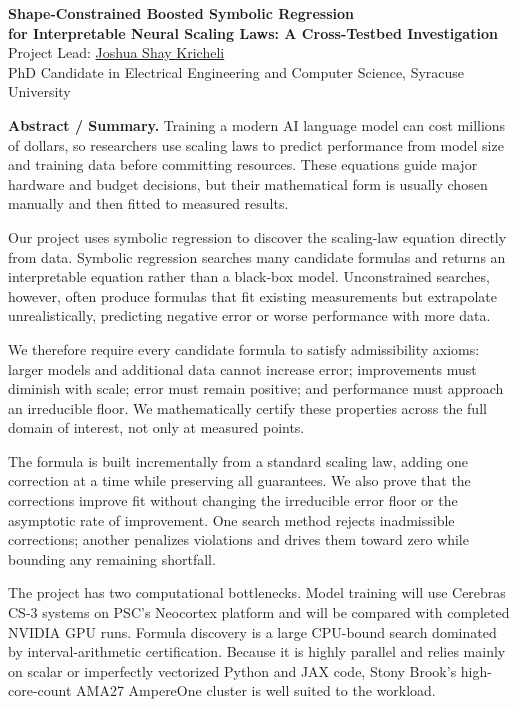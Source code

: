 \documentclass[10pt]{article}
\begin{document}
\begin{center}
 {\large\bfseries Shape-Constrained Boosted Symbolic Regression\\
    for Interpretable Neural Scaling Laws: A Cross-Testbed Investigation}\\[6pt]
    {\normalsize Project Lead: \href{https://krichelj.github.io/}{Joshua Shay Kricheli}\\
    PhD Candidate in Electrical Engineering and Computer Science, Syracuse University}
\end{center}

\smallskip
\noindent\textbf{Abstract / Summary.}
Training a modern AI language model can cost millions of dollars, so researchers use scaling laws to predict performance from model size and training data before committing resources. These equations guide major hardware and budget decisions, but their mathematical form is usually chosen manually and then fitted to measured results.

Our project uses symbolic regression to discover the scaling-law equation directly from data. Symbolic regression searches many candidate formulas and returns an interpretable equation rather than a black-box model. Unconstrained searches, however, often produce formulas that fit existing measurements but extrapolate unrealistically, predicting negative error or worse performance with more data.

We therefore require every candidate formula to satisfy admissibility axioms: larger models and additional data cannot increase error; improvements must diminish with scale; error must remain positive; and performance must approach an irreducible floor. We mathematically certify these properties across the full domain of interest, not only at measured points.

The formula is built incrementally from a standard scaling law, adding one correction at a time while preserving all guarantees. We also prove that the corrections improve fit without changing the irreducible error floor or the asymptotic rate of improvement. One search method rejects inadmissible corrections; another penalizes violations and drives them toward zero while bounding any remaining shortfall.

The project has two computational bottlenecks. Model training will use Cerebras CS-3 systems on PSC's Neocortex platform and will be compared with completed NVIDIA GPU runs. Formula discovery is a large CPU-bound search dominated by interval-arithmetic certification. Because it is highly parallel and relies mainly on scalar or imperfectly vectorized Python and JAX code, Stony Brook's high-core-count AMA27 AmpereOne cluster is well suited to the workload.
\end{document}
